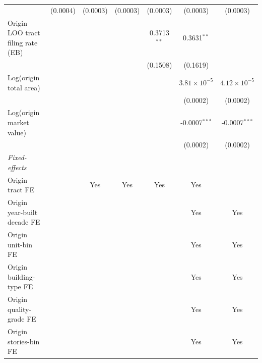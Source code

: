 \begin{tabular}{lcccccc}
                                                  & (0.0004)               & (0.0003)       & (0.0003)       & (0.0003)       & (0.0003)              & (0.0003)\\   
   Origin LOO tract filing rate (EB)              &                        &                &                & 0.3713$^{**}$  & 0.3631$^{**}$         &   \\   
                                                  &                        &                &                & (0.1508)       & (0.1619)              &   \\   
   Log(origin total area)                         &                        &                &                &                & $3.81\times 10^{-5}$  & $4.12\times 10^{-5}$\\    
                                                  &                        &                &                &                & (0.0002)              & (0.0002)\\   
   Log(origin market value)                       &                        &                &                &                & -0.0007$^{***}$       & -0.0007$^{***}$\\   
                                                  &                        &                &                &                & (0.0002)              & (0.0002)\\   
   \midrule
   \emph{Fixed-effects}\\
   Origin tract FE                                &                        & Yes            & Yes            & Yes            & Yes                   & \\  
   Origin year-built decade FE                    &                        &                &                &                & Yes                   & Yes\\  
   Origin unit-bin FE                             &                        &                &                &                & Yes                   & Yes\\  
   Origin building-type FE                        &                        &                &                &                & Yes                   & Yes\\  
   Origin quality-grade FE                        &                        &                &                &                & Yes                   & Yes\\  
   Origin stories-bin FE                          &                        &                &                &                & Yes                   & Yes\\  

\end{tabular}

